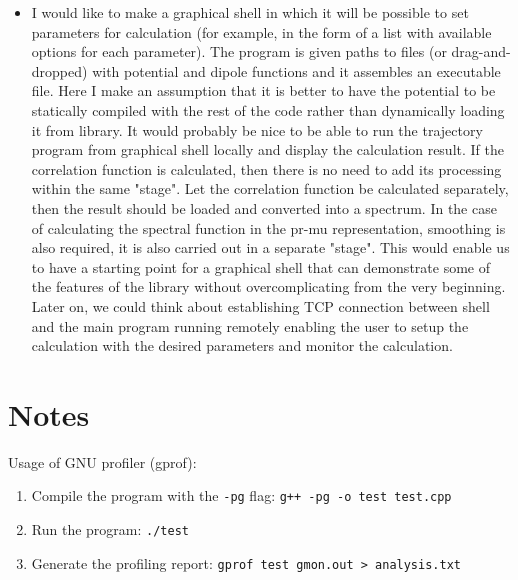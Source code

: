 \documentclass{article}
\begin{document}
\begin{itemize}
    \item I would like to make a graphical shell in which it will be possible to set parameters for calculation (for example, in the form of a list with available options for each parameter). The program is given paths to files (or drag-and-dropped) with potential and dipole functions and it assembles an executable file. Here I make an assumption that it is better to have the potential to be statically compiled with the rest of the code rather than dynamically loading it from library. It would probably be nice to be able to run the trajectory program from graphical shell locally and display the calculation result. If the correlation function is calculated, then there is no need to add its processing within the same "stage". Let the correlation function be calculated separately, then the result should be loaded and converted into a spectrum. In the case of calculating the spectral function in the pr-mu representation, smoothing is also required, it is also carried out in a separate "stage". This would enable us to have a starting point for a graphical shell that can demonstrate some of the features of the library without overcomplicating from the very beginning. Later on, we could think about establishing TCP connection between shell and the main program running remotely enabling the user to setup the calculation with the desired parameters and monitor the calculation. 
\end{itemize}

\section{Notes}

Usage of GNU profiler (gprof):
\begin{enumerate}
    \item Compile the program with the \texttt{-pg} flag: \texttt{g++ -pg -o test test.cpp}
    \item Run the program: \texttt{./test}
    \item Generate the profiling report: \texttt{gprof test gmon.out > analysis.txt}
\end{enumerate}
\end{document}
